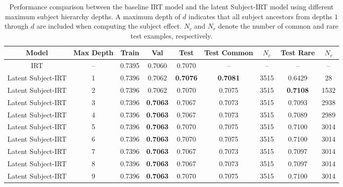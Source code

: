 \documentclass[11pt]{article}
\begin{document}
\begin{table}[H]
\centering
\small
\setlength{\tabcolsep}{4pt}
\begin{tabular}{c|c|ccc|cc|cc}
\hline
\textbf{Model} & \textbf{Max Depth}
& \textbf{Train} & \textbf{Val} & \textbf{Test}
& \textbf{Test Common} & \textbf{$N_c$}
& \textbf{Test Rare} & \textbf{$N_r$} \\
\hline

IRT & --
& 0.7395 & 0.7060 & 0.7070
& -- & --
& -- & -- \\

Latent Subject-IRT & 1
& 0.7396 & 0.7062 & \textbf{0.7076}
& \textbf{0.7081} & 3515
& 0.6429 & 28 \\

Latent Subject-IRT & 2
& 0.7396 & 0.7062 & 0.7070
& 0.7075 & 3515
& \textbf{0.7108} & 1532 \\

Latent Subject-IRT & 3
& 0.7396 & \textbf{0.7063} & 0.7067
& 0.7073 & 3515
& 0.7093 & 2938 \\

Latent Subject-IRT & 4
& 0.7396 & \textbf{0.7063} & 0.7067
& 0.7073 & 3515
& 0.7089 & 2989 \\

Latent Subject-IRT & 5
& 0.7396 & \textbf{0.7063} & 0.7070
& 0.7075 & 3515
& 0.7100 & 3014 \\

Latent Subject-IRT & 6
& 0.7396 & \textbf{0.7063} & 0.7070
& 0.7075 & 3515
& 0.7100 & 3014 \\

Latent Subject-IRT & 7
& 0.7396 & \textbf{0.7063} & 0.7067
& 0.7073 & 3515
& 0.7097 & 3014 \\

Latent Subject-IRT & 8
& 0.7396 & \textbf{0.7063} & 0.7067
& 0.7073 & 3515
& 0.7097 & 3014 \\

Latent Subject-IRT & 9
& 0.7396 & \textbf{0.7063} & 0.7070
& 0.7075 & 3515
& 0.7100 & 3014 \\

\hline
\end{tabular}
\caption{Performance comparison between the baseline IRT model and the latent Subject-IRT model using different maximum subject hierarchy depths. A maximum depth of $d$ indicates that all subject ancestors from depths $1$ through $d$ are included when computing the subject effect. $N_c$ and $N_r$ denote the number of common and rare test examples, respectively.}
\label{tab:latent_subject_depth_results}
\end{table}
\end{document}
